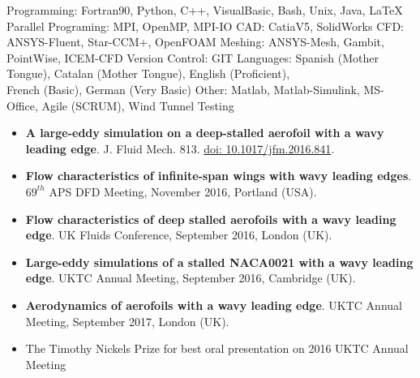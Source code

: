 \documentclass[10pt,a4paper]{article}
\begin{document}
\spacedhrule{0.5em}{-0.4em}


\inlineheadsection  %
  {Programming:}
  {Fortran90, Python, C++, VisualBasic, Bash, Unix, Java, \LaTeX}
\vspace{0.5em}
\inlineheadsection  %
  {Parallel Programing:}
  {MPI, OpenMP, MPI-IO}
\vspace{0.5em}
\inlineheadsection  %
  {CAD:}
  {CatiaV5, SolidWorks}
\vspace{0.5em}
\inlineheadsection  %
  {CFD:}
  {ANSYS-Fluent, Star-CCM+, OpenFOAM}
\vspace{0.5em}
\inlineheadsection  %
  {Meshing:}
  {ANSYS-Mesh, Gambit, PointWise, ICEM-CFD}
\vspace{0.5em}
\inlineheadsection  %
  {Version Control:}
  {GIT}
\vspace{0.5em}
\inlineheadsection
  {Languages:}
  {Spanish (Mother Tongue), Catalan (Mother Tongue), English (Proficient),\\ French (Basic), German (Very Basic)}
\vspace{0.5em}
\inlineheadsection  %
  {Other:}
  {Matlab, Matlab-Simulink, MS-Office, Agile (SCRUM), Wind Tunnel Testing}
\vspace{0.5em}

\spacedhrule{1.6em}{-0.4em}

\begin{itemize}
\item \textbf{A large-eddy simulation on a deep-stalled aerofoil with a wavy leading edge}. J. Fluid Mech. 813. \href{https://doi.org/10.1017/jfm.2016.841}{doi: 10.1017/jfm.2016.841}.
\item \textbf{Flow characteristics of infinite-span wings with wavy leading edges}. $69^{th}$ APS DFD Meeting, November 2016, Portland (USA). 
\item \textbf{Flow characteristics of deep stalled aerofoils with a wavy
leading edge}. UK Fluids Conference, September 2016, London (UK). 
\item \textbf{Large-eddy simulations of a stalled NACA0021 with a wavy
leading edge}. UKTC Annual Meeting, September 2016, Cambridge (UK).
\item \textbf{Aerodynamics of aerofoils with a wavy
leading edge}. UKTC Annual Meeting, September 2017, London (UK).
\end{itemize}

\spacedhrule{0.0em}{-0.4em}
\begin{itemize}
	\item The Timothy Nickels Prize for best oral presentation on 2016 UKTC Annual Meeting	
\end{itemize}
\end{document}
